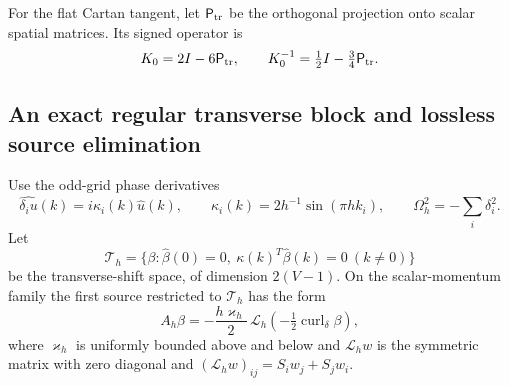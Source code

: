 \documentclass[11pt]{article}
\numberwithin{equation}{section}
\theoremstyle{definition}
\theoremstyle{remark}
\begin{document}
For the flat Cartan tangent, let $\mathsf P_{\rm tr}$ be the orthogonal
projection onto scalar spatial matrices. Its signed operator is
\begin{equation}
 K_0=2I-6\mathsf P_{\rm tr},\qquad
 K_0^{-1}=\tfrac12I-\tfrac34\mathsf P_{\rm tr}.
 \label{eq:main-exact-action-K0}
\end{equation}

\subsection{An exact regular transverse block and lossless source elimination}

Use the odd-grid phase derivatives
\begin{equation}
 \widehat{\delta_i u}(k)=i\kappa_i(k)\widehat u(k),
 \qquad \kappa_i(k)=2h^{-1}\sin(\pi hk_i),
 \qquad \Omega_h^2=-\sum_i\delta_i^2.
 \label{eq:supp-exact-phase-derivative}
\end{equation}
Let
\begin{equation}
 \mathcal T_h=\{\beta:\widehat\beta(0)=0,
 \ \kappa(k)^T\widehat\beta(k)=0\ (k\ne0)\}
 \label{eq:supp-exact-transverse-space}
\end{equation}
be the transverse-shift space, of dimension $2(V-1)$.  On the scalar-momentum
family the first source restricted to $\mathcal T_h$ has the form
\begin{equation}
 A_h\beta=-\frac{h\varkappa_h}{2}\,\mathcal L_h
          \left(-\tfrac12\operatorname{curl}_\delta\beta\right),
 \label{eq:supp-exact-transverse-source}
\end{equation}
where $\varkappa_h$ is uniformly bounded above and below and
$\mathcal L_hw$ is the symmetric matrix with zero diagonal and
$(\mathcal L_hw)_{ij}=S_iw_j+S_jw_i$.
\end{document}

